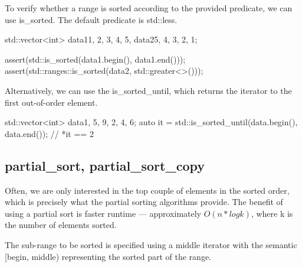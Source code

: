 To verify whether a range is sorted according to the provided predicate, we can use is\_sorted. The default predicate is std::less.



\begin{box-note}
\begin{cppcode}
std::vector<int> data1{1, 2, 3, 4, 5}, data2{5, 4, 3, 2, 1};

assert(std::is_sorted(data1.begin(), data1.end()));
assert(std::ranges::is_sorted(data2, std::greater<>()));
\end{cppcode}
\end{box-note}

Alternatively, we can use the is\_sorted\_until, which returns the iterator to the first out-of-order element.



\begin{box-note}
\begin{cppcode}
std::vector<int> data{1, 5, 9, 2, 4, 6};
auto it = std::is_sorted_until(data.begin(), data.end());
// *it == 2
\end{cppcode}
\end{box-note}

\subsection{partial\_sort, partial\_sort\_copy}

Often, we are only interested in the top couple of elements in the sorted order, which is precisely what the partial sorting algorithms provide. The benefit of using a partial sort is faster runtime — approximately $O(n*logk)$, where k is the number of elements sorted.



The sub-range to be sorted is specified using a middle iterator with the semantic [begin, middle) representing the sorted part of the range.

